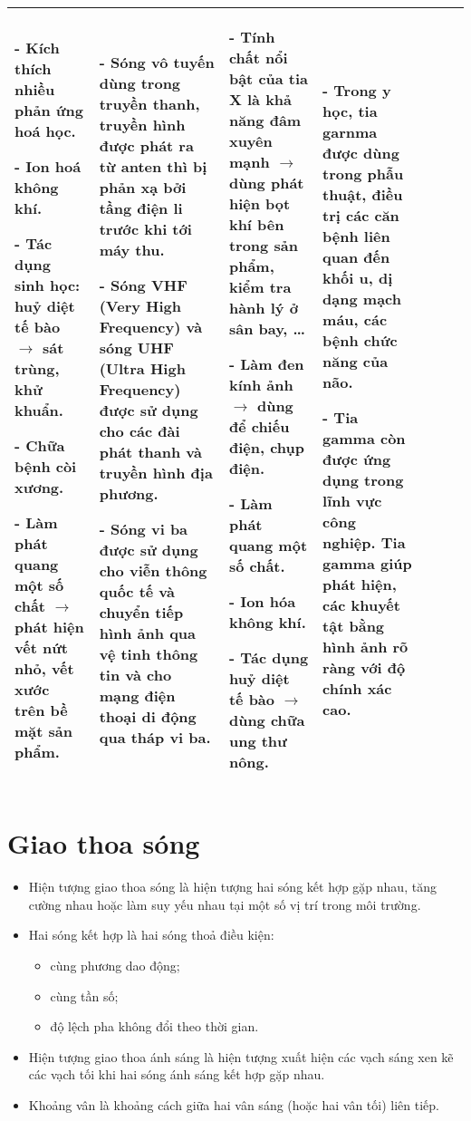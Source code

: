 \begin{center}
\begin{longtable}{|m{3em}|m{5.5em}|m{5.5em}|m{5.5em}|m{5.5em}|m{5.5em}|m{5.5em}|}
			- Kích thích nhiều phản ứng hoá học.
			
			- Ion hoá không khí.
			
			- Tác dụng sinh học: huỷ diệt tế bào $\rightarrow$ sát trùng, khử khuẩn.
			
			- Chữa bệnh còi xương.
			
			- Làm phát quang một số chất $\rightarrow$ phát hiện vết nứt nhỏ, vết xước trên bề mặt sản phẩm.
		&	
			- Sóng vô tuyến dùng trong truyền thanh, truyền hình được phát ra từ anten thì bị phản xạ bởi tầng điện li trước khi tới máy thu.
			
			- Sóng VHF (Very High Frequency) và sóng UHF (Ultra High Frequency) được sử dụng cho các đài phát thanh và truyền hình địa phương.
			
			- Sóng vi ba được sử dụng cho viễn thông quốc tế và chuyển tiếp hình ảnh qua vệ tinh thông tin và cho mạng điện thoại di động qua tháp vi ba.
	& 
		- Tính chất nổi bật của tia X là khả năng đâm xuyên mạnh $\rightarrow$ dùng phát hiện bọt khí bên trong sản phẩm, kiểm tra hành lý ở sân bay, \dots
		
		- Làm đen kính ảnh $\rightarrow$ dùng để chiếu điện, chụp điện.
		
		- Làm phát quang một số chất.
		
		- Ion hóa không khí.
		
		- Tác dụng huỷ diệt tế bào $\rightarrow$ dùng chữa ung thư nông.
&
	- Trong y học, tia garnma được dùng trong phẫu thuật, điều trị các căn bệnh liên quan đến khối u, dị dạng mạch máu, các bệnh chức năng của não.
	
	- Tia gamma còn được ứng dụng trong lĩnh vực công nghiệp. Tia gamma giúp phát hiện, các khuyết tật bằng hình ảnh rõ ràng với độ chính xác cao.
\\
\hline
	\end{longtable}
\end{center}
\section{Giao thoa sóng}
\begin{itemize}
	\item Hiện tượng giao thoa sóng là hiện tượng hai sóng kết hợp gặp nhau, tăng cường nhau hoặc làm suy yếu nhau tại một số vị trí trong môi trường.
	\item Hai sóng kết hợp là hai sóng thoả điều kiện:
	\begin{itemize}
		\item cùng phương dao động;
		\item cùng tần số;
		\item độ lệch pha không đổi theo thời gian.
	\end{itemize}
	\item Hiện tượng giao thoa ánh sáng là hiện tượng xuất hiện các vạch sáng xen kẽ các vạch tối khi hai sóng ánh sáng kết hợp gặp nhau.
	\item Khoảng vân là khoảng cách giữa hai vân sáng (hoặc hai vân tối) liên tiếp.
\end{itemize}
